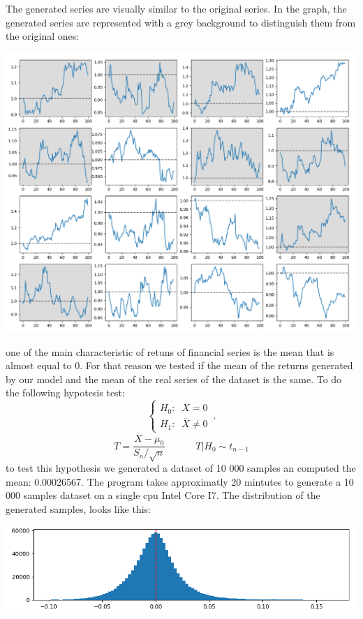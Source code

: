\documentclass{article}
\begin{document}
    \newpage
    The generated series are visually similar to the original series. In the graph, the generated series are represented with a grey background to distinguish them from the original ones:
    \begin{center}
        \includegraphics[scale=0.3]{imgs/series_comparison_README.png}
    \end{center}
    one of the main characteristic of retuns of financial series is the mean that is almost equal to 0. For that reason we tested if the mean of the returns generated by our model and the mean 
    of the real series of the dataset is the same. To do the following hypotesis test:
    \begin{equation}
        \begin{cases}
        H_0: \;\; \overline{X}=0\\
        H_1: \;\; \overline{X} \neq 0
    \end{cases}\,.
    \end{equation}
    $$T=\frac{\overline{X}-\mu_0}{S_n/\sqrt{n}} \;\;\;\;\;\;\;\;\;\;\; T|H_0 \sim t_{n-1}$$
    to test this hypothesis we generated a dataset of 10 000 samples an computed the mean: 0.00026567.
    The program takes approximatly 20 mintutes to generate a 10 000 samples dataset on a single cpu Intel Core I7. The distribution of the generated samples, looks like this:
    \begin{center}
        \includegraphics[scale=0.7]{imgs/generated.png}
    \end{center}
    
\end{document}
